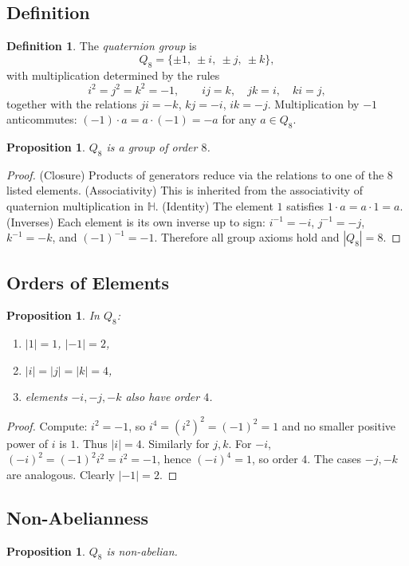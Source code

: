 \documentclass[12pt]{article}
\newtheorem{proposition}[theorem]{Proposition}
\theoremstyle{definition}
\newtheorem{definition}{Definition}
\begin{document}
\subsection*{Definition}
\begin{definition}
The \emph{quaternion group} is
\[
Q_8=\{\pm 1,\ \pm i,\ \pm j,\ \pm k\},
\]
with multiplication determined by the rules
\[
i^2=j^2=k^2=-1,\qquad ij=k,\quad jk=i,\quad ki=j,
\]
together with the relations $ji=-k$, $kj=-i$, $ik=-j$. Multiplication by $-1$ anticommutes:
$(-1)\cdot a = a\cdot(-1) = -a$ for any $a\in Q_8$.
\end{definition}

\begin{proposition}
$Q_8$ is a group of order $8$.
\end{proposition}

\begin{proof}
(Closure) Products of generators reduce via the relations to one of the $8$ listed elements.  
(Associativity) This is inherited from the associativity of quaternion multiplication in $\mathbb{H}$.  
(Identity) The element $1$ satisfies $1\cdot a=a\cdot 1=a$.  
(Inverses) Each element is its own inverse up to sign: $i^{-1}=-i$, $j^{-1}=-j$, $k^{-1}=-k$, and $(-1)^{-1}=-1$.  
Therefore all group axioms hold and $|Q_8|=8$.
\end{proof}

\subsection*{Orders of Elements}
\begin{proposition}
In $Q_8$:
\begin{enumerate}
    \item $|1|=1$, $|-1|=2$,
    \item $|i|=|j|=|k|=4$,
    \item elements $-i,-j,-k$ also have order $4$.
\end{enumerate}
\end{proposition}

\begin{proof}
Compute: $i^2=-1$, so $i^4=(i^2)^2=(-1)^2=1$ and no smaller positive power of $i$ is $1$.
Thus $|i|=4$. Similarly for $j,k$. For $-i$, $(-i)^2=(-1)^2 i^2 = i^2 = -1$, hence $(-i)^4=1$,
so order $4$. The cases $-j,-k$ are analogous. Clearly $|-1|=2$.
\end{proof}

\subsection*{Non-Abelianness}
\begin{proposition}
$Q_8$ is non-abelian.
\end{proposition}
\end{document}

